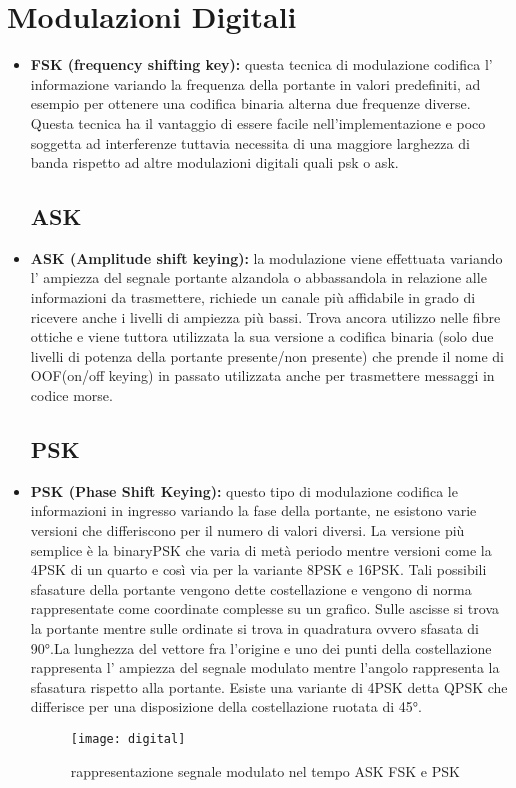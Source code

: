 \section{Modulazioni Digitali}
\label{sec:context}
\begin{itemize}
	\subsection{FSK}
  \item \textbf{FSK (frequency shifting key): } questa tecnica di modulazione codifica l' informazione variando la frequenza della portante in valori predefiniti, ad esempio per ottenere una codifica binaria alterna due frequenze diverse. Questa tecnica ha il vantaggio di essere facile nell'implementazione e poco soggetta ad interferenze tuttavia necessita di una maggiore larghezza di banda rispetto ad altre modulazioni digitali quali psk o ask.
  \cite{fsk}
  \subsection{ASK}
  \item \textbf{ASK (Amplitude shift keying): } la modulazione viene effettuata variando l' ampiezza del segnale portante alzandola o abbassandola in relazione alle informazioni da trasmettere, richiede un canale più affidabile in grado di ricevere anche i livelli di ampiezza più bassi. Trova ancora utilizzo nelle fibre ottiche e viene tuttora utilizzata la sua versione a codifica binaria (solo due livelli di potenza della portante presente/non presente) che prende il nome di OOF(on/off keying) in passato utilizzata anche per trasmettere messaggi in codice morse.
  \cite{ask}
  \subsection{PSK}
  \item \textbf{PSK (Phase Shift Keying): } questo tipo di modulazione codifica le informazioni in ingresso variando la fase della portante, ne esistono varie versioni che differiscono per il numero di valori diversi. La versione più semplice è la binaryPSK che varia di metà periodo mentre versioni come la 4PSK di un quarto e così via per la variante 8PSK e 16PSK. Tali possibili sfasature della portante vengono dette costellazione e vengono di norma rappresentate come coordinate complesse su un grafico. Sulle ascisse si trova la portante mentre sulle ordinate si trova in quadratura ovvero sfasata di 90°.La lunghezza del vettore fra l'origine e uno dei punti della costellazione rappresenta l' ampiezza del segnale modulato mentre l'angolo rappresenta la sfasatura rispetto alla portante. Esiste una variante di 4PSK detta QPSK che differisce per una disposizione della costellazione ruotata di 45°.
  \begin{figure}[h]
  	\centering
  	\texttt{[image: digital]}
  	\caption{rappresentazione segnale modulato nel tempo ASK FSK e PSK \cite{digit}}\label{fig:1}
  \end{figure}

\end{itemize}
